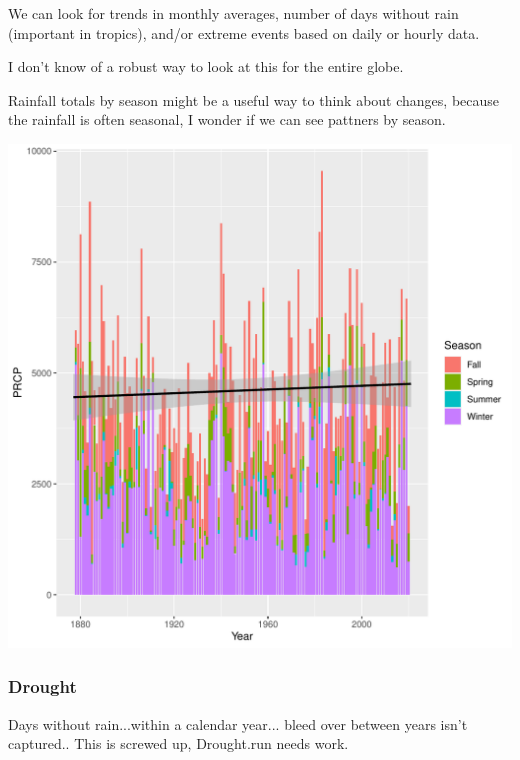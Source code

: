 \documentclass{article}\usepackage[]{graphicx}\usepackage[]{color}
\makeatletter
\def\maxwidth{ %
  \ifdim\Gin@nat@width>\linewidth
    \linewidth
  \else
    \Gin@nat@width
  \fi
}
\newenvironment{kframe}{%
 \def\at@end@of@kframe{}%
 \ifinner\ifhmode%
  \def\at@end@of@kframe{\end{minipage}}%
  \begin{minipage}{\columnwidth}%
 \fi\fi%
 \def\FrameCommand##1{\hskip\@totalleftmargin \hskip-\fboxsep
 \colorbox{shadecolor}{##1}\hskip-\fboxsep
     \hskip-\linewidth \hskip-\@totalleftmargin \hskip\columnwidth}%
 \MakeFramed {\advance\hsize-\width
   \@totalleftmargin\z@ \linewidth\hsize
   \@setminipage}}%
 {\par\unskip\endMakeFramed%
 \at@end@of@kframe}
\newenvironment{knitrout}{}{} %
\makeatother
\begin{document}
We can look for trends in monthly averages, number of days without rain (important in tropics), and/or extreme events based on daily or hourly data. 

I don't know of a robust way to look at this for the entire globe. 



Rainfall totals by season might be a useful way to think about changes, because the rainfall is often seasonal, I wonder if we can see pattners by season. 

\begin{knitrout}
\color{fgcolor}\begin{kframe}


{\ttfamily\noindent\itshape{}}\end{kframe}
\includegraphics[width=\maxwidth]{figure/unnamed-chunk-9-1} 
\end{knitrout}

\subsubsection{Drought}

Days without rain...within a calendar year... bleed over between years isn't captured.. This is screwed up, Drought.run needs work.
\end{document}
